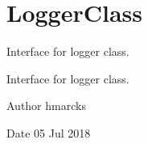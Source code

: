 \hypertarget{group__LoggerClass}{}\section{Logger\+Class}
\label{group__LoggerClass}


Interface for logger class.  


Interface for logger class. 

\begin{DoxyAuthor}{Author}
hmarcks
\end{DoxyAuthor}
\begin{DoxyDate}{Date}
05 Jul 2018 
\end{DoxyDate}
